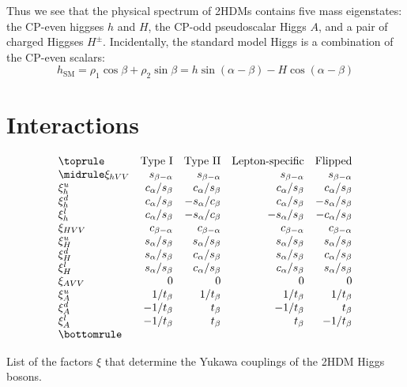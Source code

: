 Thus we see that the physical spectrum of 2HDMs contains five mass eigenstates: the CP-even higgses $h$ and $H$, the CP-odd pseudoscalar Higgs $A$, and a pair of charged Higgses $H^\pm$. Incidentally, the standard model Higgs is a combination of the CP-even scalars:
\begin{equation}
h_\text{SM} = \rho_1\cos\beta + \rho_2\sin\beta = h\sin(\alpha-\beta)-H\cos(\alpha-\beta)
\label{eq:h_SM}
\end{equation}


\section{Interactions}

\newcommand{\sbma}{s_{\beta-\alpha}}
\newcommand{\cbma}{c_{\beta-\alpha}}
\newcommand{\casb}{c_\alpha/s_\beta}
\newcommand{\sacb}{s_\alpha/c_\beta}
\newcommand{\sasb}{s_\alpha/s_\beta}
\begin{table}
  \[
    \begin{array}{lrrrr}
      \toprule
         & \text{Type I} & \text{Type II} & \text{Lepton-specific} & \text{Flipped}\\
         \midrule
      \xi_{hVV} & \sbma & \sbma & \sbma & \sbma \\
      \xi_{h}^u & \casb & \casb & \casb & \casb \\
      \xi_{h}^d & \casb & -\sacb & \casb & -\sasb \\
      \xi_{h}^l & \casb & -\sacb & -\sasb & -\casb \\
      \xi_{HVV} & \cbma & \cbma  & \cbma & \cbma \\
      \xi_{H}^u & \sasb & \sasb & \sasb & \sasb \\
      \xi_{H}^d & \sasb & \casb & \sasb & \casb \\
      \xi_{H}^l & \sasb & \casb & \casb & \sasb \\
      \xi_{AVV} & 0     & 0     & 0     & 0 \\
      \xi_{A}^u & 1/t_\beta & 1/t_\beta & 1/t_\beta & 1/t_\beta \\
      \xi_{A}^d & -1/t_\beta & t_\beta & -1/t_\beta & t_\beta \\
      \xi_{A}^l & -1/t_\beta & t_\beta & t_\beta & -1/t_\beta \\
      \bottomrule
\end{array}\]
\caption{List of the factors $\xi$ that determine the Yukawa couplings of the 2HDM Higgs bosons.}
\label{tab:xi_factors}
\end{table}

